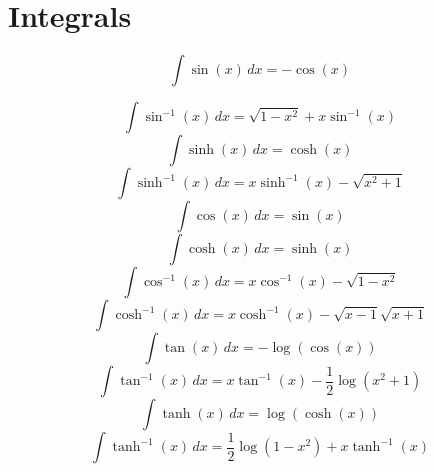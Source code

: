\documentclass[twocolumn]{amsart}
\begin{document}
\section*{Integrals}

\begin{equation*}  
\int \sin (x) \, dx = -\cos (x)
\end{equation*}

\begin{equation*}
\int \sin ^{-1}(x) \, dx = \sqrt{1-x^2}+x \sin ^{-1}(x)
\end{equation*}
\begin{equation*}
\int \sinh (x) \, dx = \cosh (x)
\end{equation*}
\begin{equation*}
\int \sinh ^{-1}(x) \, dx = x \sinh ^{-1}(x)-\sqrt{x^2+1}
\end{equation*}
\begin{equation*}
\int \cos (x) \, dx = \sin (x)
\end{equation*}
\begin{equation*}
\int \cosh (x) \, dx = \sinh (x)
\end{equation*}
\begin{equation*}
\int \cos ^{-1}(x) \, dx = x \cos ^{-1}(x)-\sqrt{1-x^2}
\end{equation*}
\begin{equation*}
\int \cosh ^{-1}(x) \, dx = x \cosh ^{-1}(x)-\sqrt{x-1} \sqrt{x+1}
\end{equation*}
\begin{equation*}
\int \tan (x) \, dx = -\log (\cos (x))
\end{equation*}
\begin{equation*}
\int \tan ^{-1}(x) \, dx = x \tan ^{-1}(x)-\frac{1}{2} \log \left(x^2+1\right)
\end{equation*}
\begin{equation*}
\int \tanh (x) \, dx = \log (\cosh (x))
\end{equation*}
\begin{equation*}
\int \tanh ^{-1}(x) \, dx = \frac{1}{2} \log \left(1-x^2\right)+x \tanh ^{-1}(x)
\end{equation*}
\end{document}
